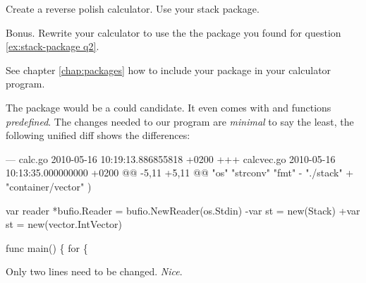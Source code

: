 \begin{Exercise}[title={Calculator},difficulty=7]
\label{ex:calc}
\Question\label{ex:calc q1} Create a reverse polish calculator. Use your
stack package.

\Question\label{ex:calc q2} Bonus. Rewrite your calculator to use the
the package you found for question \ref{ex:stack-package q2}.
\end{Exercise}

\begin{Answer}
\Question
See chapter \ref{chap:packages} how to include your package in your calculator
program.

\Question The  package would be a could candidate. It
even comes with  and  functions \emph{predefined}.
The changes needed to our program are \emph{minimal} to say the least,
the following unified diff shows the differences:
\begin{display}
--- calc.go     2010-05-16 10:19:13.886855818 +0200
+++ calcvec.go  2010-05-16 10:13:35.000000000 +0200
@@ -5,11 +5,11 @@
        "os"
        "strconv"
        "fmt"
-       "./stack"
+       "container/vector"
 )

 var reader *bufio.Reader = bufio.NewReader(os.Stdin)
-var st = new(Stack)
+var st = new(vector.IntVector)

 func main() \{
        for \{
\end{display}
\noindent{}Only two lines need to be changed. \emph{Nice}.
\end{Answer}
